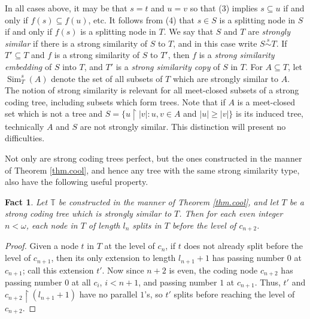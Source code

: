 \documentclass{amsart}
\newtheorem{fact}[thm]{Fact}
\theoremstyle{remark}
\theoremstyle{definition}
\theoremstyle{remark}
\newcommand{\om}{\omega}
\newcommand{\sse}{\subseteq}
\DeclareMathOperator{\Sims}{Sim}
\newcommand{\re}{\restriction}
\newcommand{\bT}{\mathbb{T}}
\newcommand{\ssim}{\stackrel{s}{\sim}}
\begin{document}
In all cases above,   it may be that $s=t$ and $u=v$
 so that (3) implies $s\sse u$ if and only if $f(s)\sse f(u)$, etc.
It follows from  (4) that
 $s\in S$ is a splitting node in $S$ if and only if  $f(s)$ is a splitting node in $T$.
We say that $S$ and $T$ are {\em strongly similar} if there is a strong similarity of $S$ to $T$, and in this case write $S\ssim T$.
If $T'\sse T$ and $f$ is a strong similarity of $S$ to $T'$, then $f$ is a {\em strong similarity embedding} of $S$ into $T$, and $T'$ is a {\em strong similarity copy} of $S$ in $T$.
For $A\sse T$, let  $\Sims^s_T(A)$ denote the set of all subsets of $T$ which are strongly similar to $A$.
The notion of strong similarity is relevant for all meet-closed subsets of a strong coding tree, including subsets which form trees.
Note that if $A$ is a meet-closed set which is not a tree and $S=\{u\re|v|:u,v\in A$ and $|u|\ge|v|\}$ is its induced tree,
technically  $A$ and $S$ are not strongly similar.
This distinction will present no difficulties.


Not only are strong coding trees perfect, but the  ones constructed in the manner of Theorem \ref{thm.cool}, and hence any tree with the same strong similarity type,
also have the following useful property.


\begin{fact}\label{fact.everytwointervalssplit}
Let $\bT$ be constructed in the manner of Theorem \ref{thm.cool}, and let $T$ be a strong coding tree which is strongly similar to $T$.
Then for each even integer $n<\om$,
each node in $T$  of length $l_n$ splits in $T$ before the level of $c_{n+2}$.
\end{fact}


\begin{proof}
Given a node $t$ in $T$ at the level of $c_n$,
if $t$ does not already split
 before the level of $c_{n+1}$,
then  its only extension to length $l_{n+1}+1$  has passing number $0$ at $c_{n+1}$;
call this extension $t'$.
Now
since $n+2$ is even,
 the coding node $c_{n+2}$ has passing number $0$
at all $c_i$, $i<n+1$, and passing number $1$ at $c_{n+1}$.
Thus, $t'$ and $c_{n+2}\re (l_{n+1}+1)$ have no parallel $1$'s, so $t'$ splits before reaching the level of $c_{n+2}$.
\end{proof}
\end{document}
